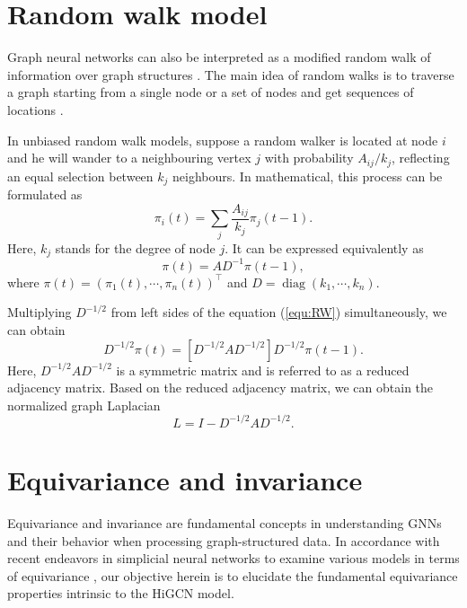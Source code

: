 \documentclass[letterpaper]{article} \usepackage{aaai24}
\theoremstyle{plain}
\theoremstyle{definition}
\theoremstyle{remark}
\begin{document}
\section{Random walk model}
\label{appendix:RW}

Graph neural networks can also be interpreted as a modified random walk of information over graph structures \cite{APPNP}. 
The main idea of random walks is to traverse a graph starting from a single node or a set of nodes and get sequences of locations \cite{HoRW}. 

In unbiased random walk models, suppose a random walker is located at node $i$ and he will wander to a neighbouring vertex $j$ with probability $A_{ij}/k_j$, reflecting an equal selection between $k_j$ neighbours. In mathematical, this process can be formulated as
\begin{equation}
    \pi_i(t) = \sum_j \frac{A_{ij}}{k_j} \pi_j(t-1).
\end{equation}
Here, $k_j$ stands for the degree of node $j$.
It can be expressed equivalently as
\begin{equation}
    \pi(t)=AD^{-1}\pi(t-1),
    \label{equ:RW}
\end{equation}
where $\pi(t) = \left(\pi_{1}(t),\cdots,\pi_{n}(t)\right)^\top$ and $D = \operatorname{diag}\left(k_1,\cdots,k_n\right)$.

Multiplying $D^{-1/2}$ from left sides of the equation (\ref{equ:RW}) simultaneously, we can obtain
\begin{equation}
    D^{-1/2}\pi(t)= \left[D^{-1/2}AD^{-1/2}\right] D^{-1/2}\pi(t-1).
    \label{equ:reducedA}
\end{equation}
Here, $D^{-1/2}AD^{-1/2}$ is a symmetric matrix and is referred to as a reduced adjacency matrix. Based on the reduced adjacency matrix, we can obtain the normalized graph Laplacian
\begin{equation}
    L = I - D^{-1/2}AD^{-1/2}.
\end{equation}




\section{Equivariance and invariance}
\label{appendix:symmetry}

Equivariance and invariance are fundamental concepts in understanding GNNs and their behavior when processing graph-structured data.
In accordance with recent endeavors in simplicial neural networks to examine various models in terms of equivariance \cite{SWL2021, Qu2020QIP, SCNN2022}, our objective herein is to elucidate the fundamental equivariance properties intrinsic to the HiGCN model.
\end{document}
